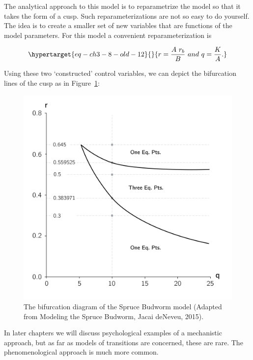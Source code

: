 \documentclass[
  a4paper,
  DIV=11,
  numbers=noendperiod,
  oneside]{scrreprt}
\begin{document}
The analytical approach to this model is to reparametrize the model so
that it takes the form of a cusp. Such reparameterizations are not so
easy to do yourself. The idea is to create a smaller set of new
variables that are functions of the model parameters. For this model a
convenient reparameterization is

\begin{equation}\protect\hypertarget{eq-ch3-8-old-12}{}{
r = \frac{A\ r_{b}}{B}\ and\ q = \frac{K}{A}.
}\label{eq-ch3-8-old-12}\end{equation}

Using these two `constructed' control variables, we can depict the
bifurcation lines of the cusp as in Figure~\ref{fig-ch3-img16-old-28}:

\begin{figure}

{\centering \includegraphics{media/ch3/ch3-16__figure28.png}

}

\caption{\label{fig-ch3-img16-old-28}The bifurcation diagram of the
Spruce Budworm model (Adapted from Modeling the Spruce Budworm, Jacai
deNeveu, 2015).}

\end{figure}

In later chapters we will discuss psychological examples of a
mechanistic approach, but as far as models of transitions are concerned,
these are rare. The phenomenological approach is much more common.
\end{document}
